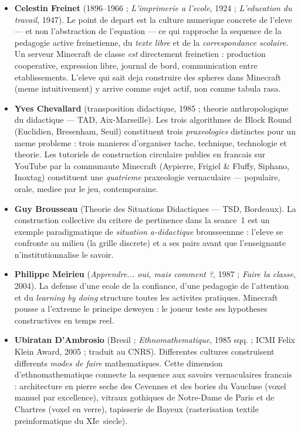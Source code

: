 \documentclass[12pt,a4paper]{scrartcl}
\newcommand{\acc}[1]{\textcolor{accent}{\textbf{#1}}}
\begin{document}
\begin{itemize}[leftmargin=1.3em,itemsep=0.2em,topsep=0.3em]
  \item \acc{Celestin Freinet} (1896--1966 ; \emph{L'imprimerie a l'ecole}, 1924 ; \emph{L'education du travail}, 1947). Le point de depart est la culture numerique concrete de l'eleve --- et non l'abstraction de l'equation --- ce qui rapproche la sequence de la pedagogie active freinetienne, du \emph{texte libre} et de la \emph{correspondance scolaire}. Un serveur Minecraft de classe \emph{est} directement freinetien : production cooperative, expression libre, journal de bord, communication entre etablissements. L'eleve qui sait deja construire des spheres dans Minecraft (meme intuitivement) y arrive comme sujet actif, non comme tabula rasa.

  \item \acc{Yves Chevallard} (transposition didactique, 1985 ; theorie anthropologique du didactique --- TAD, Aix-Marseille). Les trois algorithmes de Block Round (Euclidien, Bresenham, Seuil) constituent trois \emph{praxeologies} distinctes pour un meme probleme : trois manieres d'organiser tache, technique, technologie et theorie. Les tutoriels de construction circulaire publies en francais sur YouTube par la communaute Minecraft (Aypierre, Frigiel \& Fluffy, Siphano, Inoxtag) constituent une \emph{quatrieme} praxeologie vernaculaire --- populaire, orale, mediee par le jeu, contemporaine.

  \item \acc{Guy Brousseau} (Theorie des Situations Didactiques --- TSD, Bordeaux). La construction collective du critere de pertinence dans la seance~1 est un exemple paradigmatique de \emph{situation a-didactique} brousseennne : l'eleve se confronte au milieu (la grille discrete) et a ses pairs avant que l'enseignant\textperiodcentered e n'institutionnalise le savoir.

  \item \acc{Philippe Meirieu} (\emph{Apprendre... oui, mais comment ?}, 1987 ; \emph{Faire la classe}, 2004). La defense d'une ecole de la confiance, d'une pedagogie de l'attention et du \emph{learning by doing} structure toutes les activites pratiques. Minecraft pousse a l'extreme le principe deweyen : le joueur teste ses hypotheses constructives en temps reel.

  \item \acc{Ubiratan D'Ambrosio} (Bresil ; \emph{Ethnomathematique}, 1985 sqq. ; ICMI Felix Klein Award, 2005 ; traduit au CNRS). Differentes cultures construisent differents \emph{modes de faire} mathematiques. Cette dimension d'ethnomathematique connecte la sequence aux savoirs vernaculaires francais : architecture en pierre seche des Cevennes et des bories du Vaucluse (voxel manuel par excellence), vitraux gothiques de Notre-Dame de Paris et de Chartres (voxel en verre), tapisserie de Bayeux (rasterisation textile preinformatique du XIe~siecle).
\end{itemize}
\end{document}
